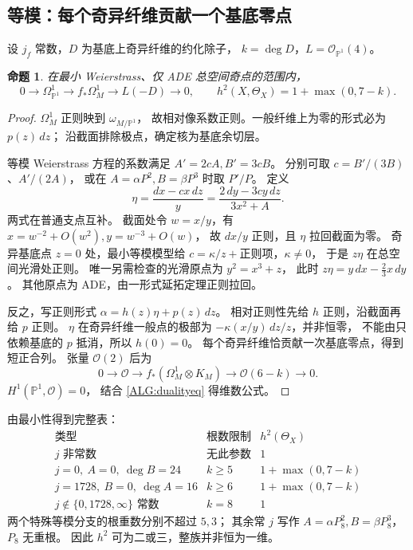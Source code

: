 \documentclass[UTF8,fontset=fandol,zihao=-4,oneside,openany]{ctexbook}
\theoremstyle{cjkplain}
\newtheorem{proposition}[theorem]{命题}
\numberwithin{equation}{chapter}
\begin{document}
\subsection{等模：每个奇异纤维贡献一个基底零点}

设 $j_f$ 常数，$D$ 为基底上奇异纤维的约化除子，
$k=\deg D$，$L=\mathcal O_{\mathbb P^1}(4)$。
\begin{proposition}
\label{ALG:isotrivial}
在最小 Weierstrass、仅 ADE 总空间奇点的范围内，
\begin{equation}
0\to\Omega_{\mathbb P^1}^1\to f_*\Omega_M^1\to L(-D)\to0,
\qquad
h^2(X,\Theta_X)=1+\max(0,7-k).
\label{ALG:isodim}
\end{equation}
\end{proposition}
\begin{proof}
$\Omega_M^1$ 正则映到 $\omega_{M/\mathbb P^1}$，
故相对像系数正则。一般纤维上为零的形式必为 $p(z)\,dz$；
沿截面排除极点，确定核为基底余切层。

等模 Weierstrass 方程的系数满足
$A'=2cA,B'=3cB$。
分别可取 $c=B'/(3B)$、$A'/(2A)$，
或在 $A=\alpha P^2,B=\beta P^3$ 时取 $P'/P$。
定义
\begin{equation}
\eta=\frac{dx-cx\,dz}{y}
=\frac{2\,dy-3cy\,dz}{3x^2+A}.
\label{ALG:eta}
\end{equation}
两式在普通支点互补。
截面处令 $w=x/y$，有 $x=w^{-2}+O(w^2),y=w^{-3}+O(w)$，
故 $dx/y$ 正则，且 $\eta$ 拉回截面为零。
奇异基底点 $z=0$ 处，最小等模模型给
$c=\kappa/z+\text{正则项}$，$\kappa\ne0$，
于是 $z\eta$ 在总空间光滑处正则。
唯一另需检查的光滑原点为 $y^2=x^3+z$，
此时 $z\eta=y\,dx-\frac23x\,dy$。
其他原点为 ADE，由一形式延拓定理正则拉回。

反之，写正则形式 $\alpha=h(z)\eta+p(z)\,dz$。
相对正则性先给 $h$ 正则，沿截面再给 $p$ 正则。
$\eta$ 在奇异纤维一般点的极部为
$-\kappa(x/y)\,dz/z$，并非恒零，
不能由只依赖基底的 $p$ 抵消，所以 $h(0)=0$。
每个奇异纤维恰贡献一次基底零点，得到短正合列。
张量 $\mathcal O(2)$ 后为
\[
0\to\mathcal O\to f_*(\Omega_M^1\otimes K_M)\to\mathcal O(6-k)\to0.
\]
$H^1(\mathbb P^1,\mathcal O)=0$，
结合 \eqref{ALG:dualityeq} 得维数公式。
\end{proof}

由最小性得到完整表：
\[
\begin{array}{c|c|c}
\text{类型}&\text{根数限制}&h^2(\Theta_X)\\ \hline
j\text{ 非常数}&\text{无此参数}&1\\
j=0,\ A=0,\ \deg B=24&k\ge5&1+\max(0,7-k)\\
j=1728,\ B=0,\ \deg A=16&k\ge6&1+\max(0,7-k)\\
j\notin\{0,1728,\infty\}\text{ 常数}&k=8&1
\end{array}
\]
两个特殊等模分支的根重数分别不超过 $5,3$；
其余常 $j$ 写作 $A=\alpha P_8^2,B=\beta P_8^3$，$P_8$ 无重根。
因此 $h^2$ 可为二或三，整族并非恒为一维。
\end{document}
